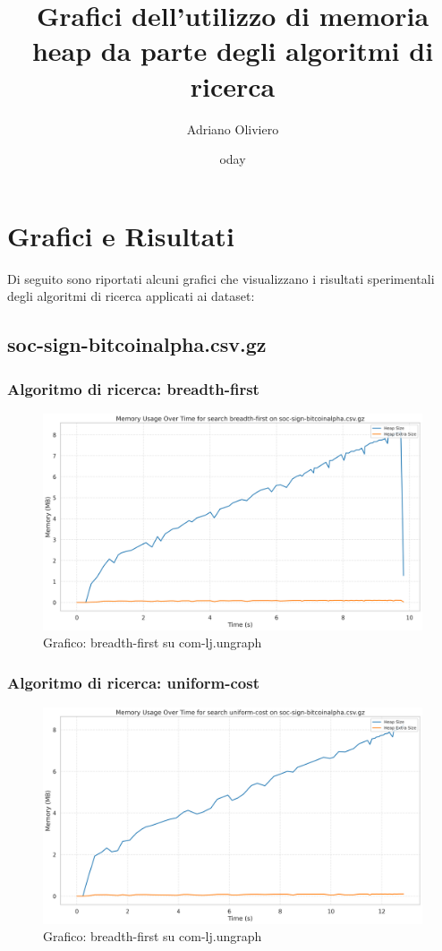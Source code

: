 \documentclass{article}
\title{Grafici dell'utilizzo di memoria heap da parte degli algoritmi di ricerca}
\author{Adriano Oliviero}
\date{	oday}
\begin{document}
\maketitle
\tableofcontents
\newpage
\section{Grafici e Risultati}
Di seguito sono riportati alcuni grafici che visualizzano i risultati sperimentali degli algoritmi di ricerca applicati ai dataset:
\subsection{soc-sign-bitcoinalpha.csv.gz}
\subsubsection{Algoritmo di ricerca: breadth-first}
\begin{figure}[htbp]\centering
\includegraphics[width=\textwidth]{../plots/soc-sign-bitcoinalpha.csv_breadth-first.png}
\caption{Grafico: breadth-first su com-lj.ungraph}
\end{figure}
\subsubsection{Algoritmo di ricerca: uniform-cost}
\begin{figure}[htbp]\centering
\includegraphics[width=\textwidth]{../plots/soc-sign-bitcoinalpha.csv_uniform-cost.png}
\caption{Grafico: breadth-first su com-lj.ungraph}
\end{figure}
\end{document}
